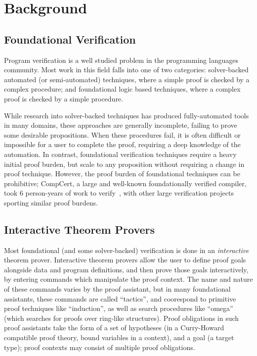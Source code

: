 \documentclass[sigplan,screen]{acmart}
\renewcommand{\>}{\quad}
\begin{document}
 \section{Background}
\label{sec:background}

\subsection{Foundational Verification}
Program verification is a well studied problem
  in the programming languages community.
Most work in this field falls into one of two categories:
  solver-backed automated (or semi-automated) techniques,
  where a simple proof is checked by a complex procedure;
  and foundational logic based techniques,
  where a complex proof is checked by a simple procedure.

While research into solver-backed techniques
  has produced fully-automated tools in many domains,
  these approaches are generally incomplete,
  failing to prove some desirable propositions.
When these procedures fail,
  it is often difficult or impossible for a user to complete the proof,
  requiring a deep knowledge of the automation.
In contrast,
  foundational verification techniques require a heavy initial proof burden,
  but scale to any proposition without requiring a change in proof technique.
However, the proof burden of foundational techniques can be prohibitive;
  CompCert, a large and well-known foundationally verified compiler,
  took 6 person-years of work to verify~\cite{compcert-experience},
  with other large verification projects sporting similar proof burdens.

\subsection{Interactive Theorem Provers}
Most foundational (and some solver-backed) verification
  is done in an \textit{interactive} theorem prover.
Interactive theorem provers allow the user to define proof goals
  alongside data and program definitions,
  and then prove those goals interactively,
  by entering commands which manipulate the proof context.
The name and nature of these commands varies by the proof assistant,
  but in many foundational assistants,
  these commands are called ``tactics'',
  and coorespond to primitive proof techniques like ``induction'',
  as well as search procedures like ``omega''
  (which searches for proofs over ring-like structures).
Proof obligations in such proof assistants take the form of a set of hypotheses
  (in a Curry-Howard compatible proof theory, bound variables in a context),
  and a goal (a target type);
  proof contexts may consist of multiple proof obligations.
\end{document}
